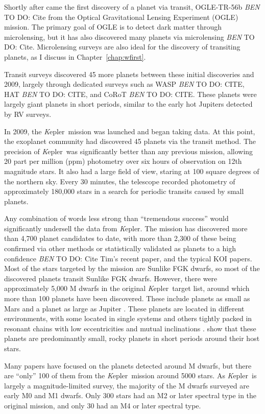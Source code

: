\documentclass[12pt]{caltech_thesis}
\newcommand{\todo}[3]{{\color{#2} \emph{#1} TO DO: #3}}
\newcommand{\btmtodo}[1]{\todo{BEN}{red}{#1}}
\newcommand{\kep}{{\textit Kepler}}
\begin{document}
Shortly after came the first discovery of a planet via transit, OGLE-TR-56b \btmtodo{Cite} from the Optical Gravitational Lensing Experiment (OGLE) mission.
The primary goal of OGLE is to detect dark matter through microlensing, but it has also discovered 
many planets via microlensing \btmtodo{Cite}.
Microlensing surveys are also ideal for the discovery of transiting planets, as 
I discuss in Chapter~\ref{chap:wfirst}.

Transit surveys discovered 45 more planets between these initial discoveries and 2009, largely through dedicated surveys such as WASP \btmtodo{CITE}, HAT \btmtodo{CITE}, and
CoRoT \btmtodo{CITE}.
These planets were largely giant planets in short periods, similar to the early hot Jupiters
detected by RV surveys. 

In 2009, the \kep\ mission \citep{Borucki10} was launched and began taking data.
At this point, the exoplanet community had discovered 45 planets via the transit
method.
The precision of \kep\ was significantly better than any previous mission, allowing
20 part per million (ppm) photometry over six hours of observation on 12th magnitude
stars. 
It also had a large field of view, staring at 100 square degrees of the northern sky.
Every 30 minutes, the telescope recorded photometry of approximately 180,000 stars in a
search for periodic transits caused by small planets.

Any combination of words less strong than ``tremendous success'' would significantly undersell the data from \kep.
The mission has discovered more than 4,700 planet candidates to date, with more than 
2,300 of these being confirmed via other methods or statistically validated as planets
to a high confidence \btmtodo{Cite Tim's recent paper, and the typical KOI papers}.
Most of the stars targeted by the mission are Sunlike FGK dwarfs, so most of the discovered
planets transit Sunlike FGK dwarfs.
However, there were approximately 5,000 M dwarfs in the original \kep\ target list, around
which more than 100 planets have been discovered.
These include planets as small as Mars \citep{KOI961} and a planet as large as Jupiter
\citep{Johnson11c}.
These planets are located in different environments, with some located in single systems
and others tightly packed in resonant chains with low eccentricities and mutual inclinations
\citep{Swift13, Ballard16}.
\citet{Morton14} show that these planets are predominantly small, rocky planets in short
periods around their host stars.

Many papers have focused on the planets detected around M dwarfs, but there are ``only'' 100
of them from the \kep\ mission around 5000 stars. As \kep\ is largely a magnitude-limited
survey, the majority of the M dwarfs surveyed are early M0 and M1 dwarfs. 
Only 300 stars had an M2 or later spectral type in the original mission, and only 30 had
an M4 or later spectral type.
\end{document}
